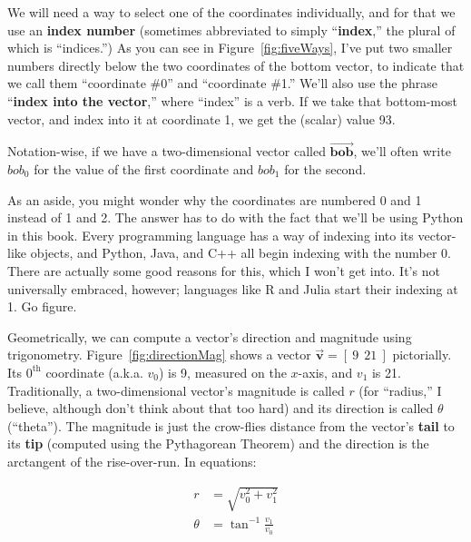 
We will need a way to select one of the coordinates individually, and for that
we use an \textbf{index number} (sometimes abbreviated to simply
``\textbf{index},'' the plural of which is ``indices.'') As you can see in
Figure~\ref{fig:fiveWays}, I've put two smaller numbers directly below the two
coordinates of the bottom vector, to indicate that we call them ``coordinate
\#0'' and ``coordinate \#1.'' We'll also use the phrase ``\textbf{index into
the vector},'' where ``index'' is a verb. If we take that bottom-most vector,
and index into it at coordinate 1, we get the (scalar) value 93.

Notation-wise, if we have a two-dimensional vector called
$\overrightarrow{\textbf{bob}}$, we'll often write $bob_0$ for the value of the
first coordinate and $bob_1$ for the second.

As an aside, you might wonder why the coordinates are numbered 0 and 1 instead
of 1 and 2. The answer has to do with the fact that we'll be using Python in
this book. Every programming language has a way of indexing into its
vector-like objects, and Python, Java, and C++ all begin indexing with the
number 0. There are actually some good reasons for this, which I won't get
into. It's not universally embraced, however; languages like R and Julia start
their indexing at 1. Go figure.


Geometrically, we can compute a vector's direction and magnitude using
trigonometry. Figure~\ref{fig:directionMag} shows a vector
$\overrightarrow{\textbf{v}} = [\ 9 \ \ 21\ ]$ pictorially. Its $0^\text{th}$
coordinate (a.k.a. $v_0$) is 9, measured on the $x$-axis, and $v_1$ is 21.
Traditionally, a two-dimensional vector's magnitude is called $r$ (for
``radius,'' I believe, although don't think about that too hard) and its
direction is called $\theta$ (``theta''). The magnitude is just the crow-flies
distance from the vector's \textbf{tail} to its \textbf{tip} (computed using
the Pythagorean Theorem) and the direction is the arctangent of the
rise-over-run. In equations:

\vspace{-.25in}
\begin{align*}
r &= \sqrt{v_0^2 + v_1^2} \\
\theta &= \tan^{-1} \frac{v_1}{v_0} \\
\end{align*}
\vspace{-.55in}


